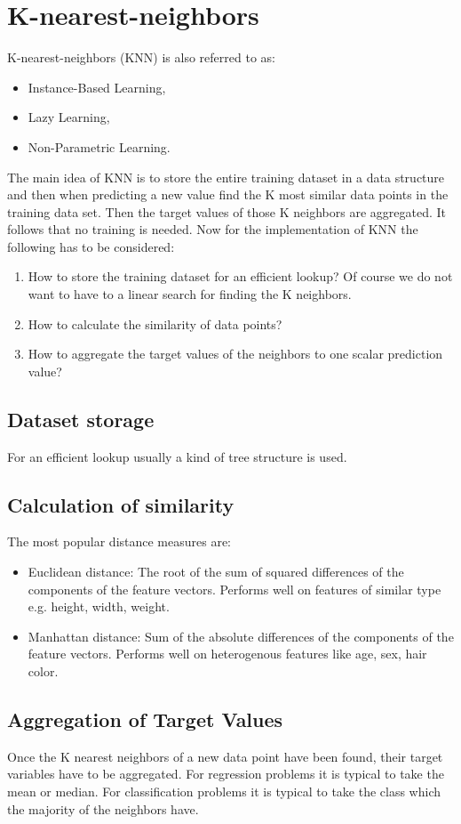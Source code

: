 \section{K-nearest-neighbors}

K-nearest-neighbors (KNN) is also referred to as:

\begin{itemize}
    \item Instance-Based Learning,
    \item Lazy Learning,
    \item Non-Parametric Learning.
\end{itemize}

The main idea of KNN is to store the entire training dataset in a data structure and then when predicting a new value find the K most similar data points in the training data set. Then the target values of those K neighbors are aggregated. It follows that no training is needed. Now for the implementation of KNN the following has to be considered:

\begin{enumerate}
    \item How to store the training dataset for an efficient lookup? Of course we do not want to have to a linear search for finding the K neighbors.
    \item How to calculate the similarity of data points?
    \item How to aggregate the target values of the neighbors to one scalar prediction value?
\end{enumerate}

\subsection*{Dataset storage}

For an efficient lookup usually a kind of tree structure is used.

\subsection*{Calculation of similarity}

The most popular distance measures are:
\begin{itemize}
    \item Euclidean distance: The root of the sum of squared differences of the components of the feature vectors. Performs well on features of similar type e.g. height, width, weight.
    \item Manhattan distance: Sum of the absolute differences of the components of the feature vectors. Performs well on heterogenous features like age, sex, hair color.
\end{itemize}

\subsection*{Aggregation of Target Values}
Once the K nearest neighbors of a new data point have been found, their target variables have to be aggregated. For regression problems it is typical to take the mean or median. For classification problems it is typical to take the class which the majority of the neighbors have.
